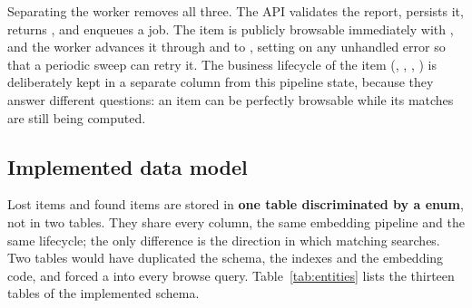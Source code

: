 Separating the worker removes all three. The API validates the report, persists
it, returns , and enqueues a job. The item is publicly
browsable immediately with , and the worker
advances it through  and  to ,
setting  on any unhandled error so that a periodic sweep can retry
it. The business lifecycle of the item (, ,
, ) is deliberately kept in a separate column from
this pipeline state, because they answer different questions: an item can be
perfectly browsable while its matches are still being computed.

\subsection{Implemented data model}

Lost items and found items are stored in \textbf{one  table
discriminated by a  enum}, not in two tables. They share every column,
the same embedding pipeline and the same lifecycle; the only difference is the
direction in which matching searches. Two tables would have duplicated the
schema, the indexes and the embedding code, and forced a  into every
browse query. Table~\ref{tab:entities} lists the thirteen tables of the
implemented schema.


